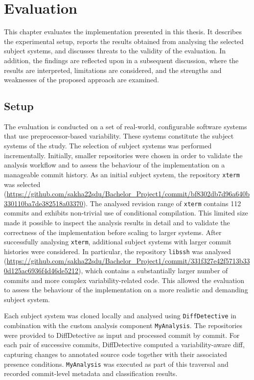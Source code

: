 \chapter{Evaluation}
This chapter evaluates the implementation presented in this thesis. It describes the experimental setup, reports the results obtained from analysing the selected subject systems, and discusses threats to the validity of the evaluation. In addition, the findings are reflected upon in a subsequent discussion, where the results are interpreted, limitations are considered, and the strengths and weaknesses of the proposed approach are examined.
\section{Setup} 
The evaluation is conducted on a set of real-world, configurable software systems that use preprocessor-based variability. These systems constitute the subject systems of the study. The selection of subject systems was performed incrementally. Initially, smaller repositories were chosen in order to validate the analysis workflow and to assess the behaviour of the implementation on a manageable commit history. 
As an initial subject system, the repository \texttt{xterm} was selected (\url{https://github.com/sakha22sdu/Bachelor_Project1/commit/bf8302db7d96a640b330110ba7de382518a03370}). The analysed revision range of \texttt{xterm} contains 112 commits and exhibits non-trivial use of conditional compilation. This limited size made it possible to inspect the analysis results in detail and to validate the correctness of the implementation before scaling to larger systems. After successfully analysing \texttt{xterm}, additional subject systems with larger commit histories were considered. In particular, the repository \texttt{libssh} was analysed (\url{https://github.com/sakha22sdu/Bachelor_Project1/commit/331f327e42f5713b330d125ac6936f4d46de5212}), which contains a substantially larger number of commits and more complex variability-related code. This allowed the evaluation to assess the behaviour of the implementation on a more realistic and demanding subject system. 
 
Each subject system was cloned locally and analysed using \texttt{DiffDetective} in combination with the custom analysis component \texttt{MyAnalysis}. The repositories were provided to DiffDetective as input and processed commit by commit. For each pair of successive commits, DiffDetective computed a variability-aware diff, capturing changes to annotated source code together with their associated presence conditions. \texttt{MyAnalysis} was executed as part of this traversal and recorded commit-level metadata and classification results. 
 
